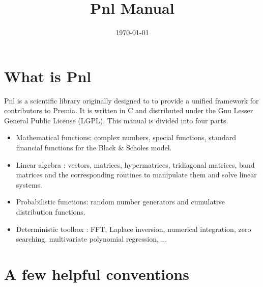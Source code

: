 \documentclass[a4paper,11pt,twoside]{article}
\title{Pnl Manual}
\date{\today}
\author{}
\begin{document}
\maketitle
\tableofcontents

\section{What is Pnl}

Pnl is a scientific library originally designed to to provide a unified
framework for contributors to Premia. It is written in C and distributed under
the Gnu Lesser General Public License (LGPL). This manual is divided into four
parts.
\begin{itemize}
\item Mathematical functions: complex numbers, special functions, standard
  financial functions for the Black \& Scholes model.
\item Linear algebra : vectors, matrices, hypermatrices, tridiagonal matrices,
  band matrices and the corresponding routines to manipulate them and solve linear systems.
\item Probabilistic functions: random number generators and  cumulative
  distribution functions.
\item Deterministic toolbox : FFT, Laplace inversion, numerical integration, zero searching,
  multivariate polynomial regression, $\dots$
\end{itemize}

\section{A few helpful conventions}
\end{document}
